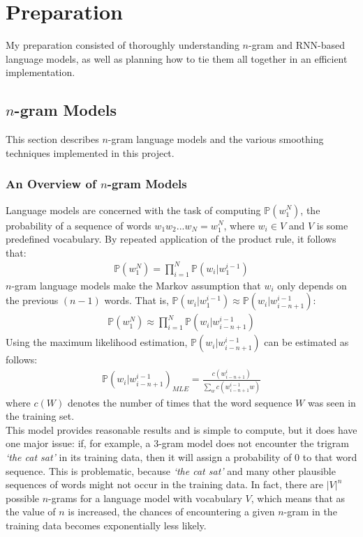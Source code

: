 \documentclass[a4paper, 12pt]{report}
\newcommand{\tit}[1]{\textit{#1}}
\begin{document}
\chapter{Preparation} \label{preparation}

My preparation consisted of thoroughly understanding $n$-gram and RNN-based language models, as well as planning how to tie them all together in an efficient implementation.

\section{$n$-gram Models} \label{ngram_models}

This section describes $n$-gram language models and the various smoothing techniques implemented in this project.

\subsection{An Overview of $n$-gram Models}

Language models are concerned with the task of computing $\mathbb{P}(w_1^N)$, the probability of a sequence of words $w_1w_2...w_N = w_1^N$, where $w_i \in V$ and $V$ is some predefined vocabulary. By repeated application of the product rule, it follows that:
\begin{gather}
	\mathbb{P}(w_1^N) = \prod_{i = 1}^N \mathbb{P}(w_i | w_1^{i - 1})
\end{gather}
$n$-gram language models make the Markov assumption that $w_i$ only depends on the previous $(n - 1)$ words. That is, $\mathbb{P}(w_i | w_1^{i - 1}) \approx \mathbb{P}(w_i | w_{i - n + 1}^{i - 1})$:
\begin{gather}
	\mathbb{P}(w_1^N) \approx \prod_{i = 1}^N \mathbb{P}(w_i | w_{i - n + 1}^{i - 1})
\end{gather}
Using the maximum likelihood estimation, $\mathbb{P}(w_i | w_{i - n + 1}^{i - 1})$ can be estimated as follows:
\begin{gather} \label{eq:ngram}
	\mathbb{P}(w_i | w_{i - n + 1}^{i - 1})_{MLE} = \frac{c(w_{i - n + 1}^{i})}{\sum_w c(w_{i - n + 1}^{i - 1}w)}
\end{gather}
where $c(W)$ denotes the number of times that the word sequence $W$ was seen in the training set. \\

This model provides reasonable results and is simple to compute, but it does have one major issue: if, for example, a 3-gram model does not encounter the trigram \tit{`the cat sat'} in its training data, then it will assign a probability of 0 to that word sequence. This is problematic, because \tit{`the cat sat'} and many other plausible sequences of words might not occur in the training data. In fact, there are $|V|^n$ possible $n$-grams for a language model with vocabulary $V$, which means that as the value of $n$ is increased, the chances of encountering a given $n$-gram in the training data becomes exponentially less likely. \\
\end{document}
